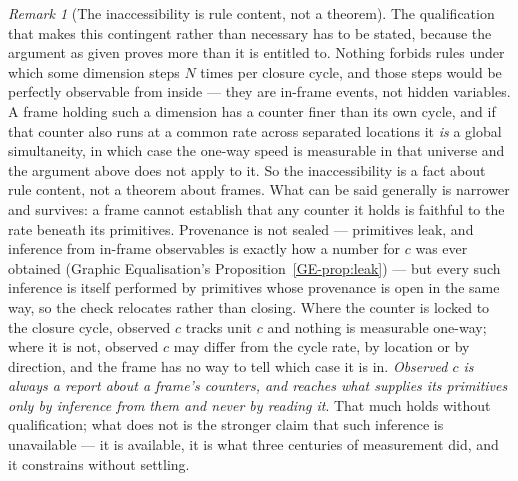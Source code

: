 \documentclass[11pt,a4paper]{article}
\theoremstyle{remark}\newtheorem{remark}[definition]{Remark}
\begin{document}
\begin{remark}[The inaccessibility is rule content, not a theorem]\label{rem:oneway-rule}
The qualification that makes this contingent rather than necessary has to be stated, because the
argument as given proves more than it is entitled to. Nothing forbids rules under which some
dimension steps $N$ times per closure cycle, and those steps would be perfectly observable from
inside --- they are in-frame events, not hidden variables. A frame holding such a dimension has a
counter finer than its own cycle, and if that counter also runs at a common rate across separated
locations it \emph{is} a global simultaneity, in which case the one-way speed is measurable in that
universe and the argument above does not apply to it. So the inaccessibility is a fact about rule
content, not a theorem about frames. What can be said generally is narrower and survives: a frame
cannot establish that any counter it holds is faithful to the rate beneath its primitives. Provenance
is not sealed --- primitives leak, and inference from in-frame observables is exactly how a number for
$c$ was ever obtained (Graphic Equalisation's Proposition~\ref{GE-prop:leak}) --- but every such
inference is
itself performed by primitives whose provenance is open in the same way, so the check relocates
rather than closing. Where the counter is locked to the closure cycle, observed $c$ tracks unit $c$
and nothing is measurable one-way; where it is not, observed $c$ may differ from the cycle rate, by
location or by direction, and the frame has no way to tell which case it is in. \emph{Observed $c$ is
always a report about a frame's counters, and reaches what supplies its primitives only by inference
from them and never by reading it}. That much holds without qualification; what does not is the
stronger claim that such inference is unavailable --- it is available,
it is what three centuries of measurement did, and it constrains without settling.
\end{remark}
\end{document}
